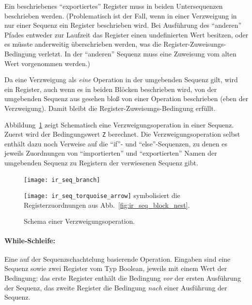 \documentclass[twoside,a4paper,fleqn,12pt]{book}
\begin{document}
Ein beschriebenes "`exportiertes"' Register muss in beiden Untersequenzen beschrieben werden. (Problematisch ist der Fall, wenn in einer Verzweigung
in nur einer Sequenz ein Register beschrieben wird. Bei Ausführung des "`anderen"' Pfades entweder zur Laufzeit das Register einen undefinierten Wert besitzen, oder
es müsste anderweitig überschrieben werden, was die Register-Zuweisungs-Bedingung verletzt. In der "`anderen"' Sequenz muss eine Zuweisung vom alten
Wert vorgenommen werden.)

Da eine Verzweigung als \emph{eine} Operation in der umgebenden Sequenz gilt, wird ein Register, auch wenn es in beiden Blöcken beschrieben wird, 
von der umgebenden Sequenz aus gesehen bloß von einer Operation beschrieben (eben der Verzweigung). Damit bleibt die Register-Zuweisungs-Bedingung erfüllt.



Abbildung~\ref{fig:ir_seq_branch} zeigt Schematisch eine Verzweigungsoperation in einer Sequenz.
Zuerst wird der Bedingungswert \texttt{Z} berechnet. Die Verzweigungsoperation selbst enthält dazu noch
Verweise auf die ``if''- und ``else''-Sequenzen, zu denen es jeweils Zuordnungen von "`importierten"' und "`exportierten"' 
Namen der umgebenden Sequenz zu Registern der verwiesenen Sequenz gibt.

\begin{figure}[h]
   \centering
  \texttt{[image: ir\_seq\_branch]}
  \caption{Schema einer Verzweigungsoperation.}
  \small\texttt{[image: ir\_seq\_torquoise\_arrow]} symbolisiert die Registerzuordnungen aus Abb.~\ref{fig:ir_seq_block_nest}.
  \label{fig:ir_seq_branch}
\end{figure}

\paragraph{While-Schleife:} Eine auf der Sequenzschachtelung basierende Operation. Eingaben sind eine Sequenz sowie zwei Register vom
Typ Boolean, jeweils mit einem Wert der Bedingung: das erste Register enthält die Bedingung \emph{vor} der ersten Ausführung der Sequenz,
das zweite Register die Bedingung \emph{nach} einer Ausführung der Sequenz.
\end{document}
